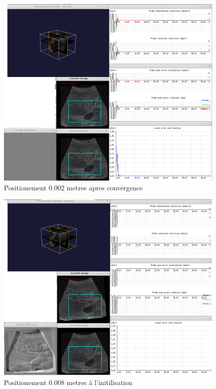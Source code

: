 \documentclass[a4paper,11pt]{article}
\begin{document}
\begin{figure}[H]
    \centering
    \includegraphics[width=0.5\textheight]{./images/q13_0,002_end.png}
    \caption{ Positionement 0.002 metres apres convergence }
    \label{q13_2}
\end{figure}
\begin{figure}[H]
    \centering
    \includegraphics[width=0.5\textheight]{./images/q13_0,008_begin.png}
    \caption{ Positionement 0.008 metres \`a l'initilisation }
    \label{q13_3}
\end{figure}
\end{document}
